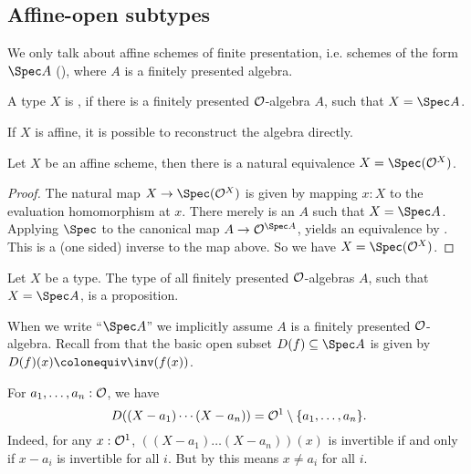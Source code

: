 \subsection{Affine-open subtypes}

We only talk about affine schemes of finite presentation, i.e. schemes of the form $\Spec A$ (),
where $A$ is a finitely presented algebra.

\begin{definition}%
  A type $X$ is ,
  if there is a finitely presented $\mathcal O$-algebra $A$, such that $X=\Spec A$.
\end{definition}

If $X$ is affine, it is possible to reconstruct the algebra directly.

\begin{lemma}%
  \label{algebra-from-affine-scheme}
  Let $X$ be an affine scheme, then there is a natural equivalence $X=\Spec (\A^X)$.
\end{lemma}

\begin{proof}
  The natural map $X\to \Spec (\A^X)$ is given by mapping $x:X$ to the
  evaluation homomorphism at $x$. 
  There merely is an $A$ such that $X=\Spec A$.
  Applying $\Spec$ to the canonical map $A\to \A^{\Spec A}$,
  yields an equivalence by .
  This is a (one sided) inverse to the map above.
  So we have $X=\Spec (\A^X)$.
\end{proof}

\begin{proposition}%
  Let $X$ be a type.
  The type of all finitely presented $\mathcal O$-algebras $A$, such that $X=\Spec A$, is a proposition.
\end{proposition}

When we write ``$\Spec A$'' we implicitly assume $A$ is a finitely presented $\mathcal O$-algebra.
Recall from 
that the basic open subset $D(f) \subseteq \Spec A$
is given by $D(f)(x)\colonequiv \inv(f(x))$.

\begin{example}
  For $a_1, \dots, a_n : \mathcal O$, we have
  \[ D((X - a_1) \cdots (X - a_n)) = \A^1 \setminus \{ a_1, \dots, a_n \} \rlap{.}\]
  Indeed,
  for any $x : \mathcal O^1$,
  $((X - a_1) \dots (X - a_n))(x)$ is invertible if and only if
  $x - a_i$ is invertible for all $i$.
  But by 
  this means $x \neq a_i$ for all $i$.
\end{example}


